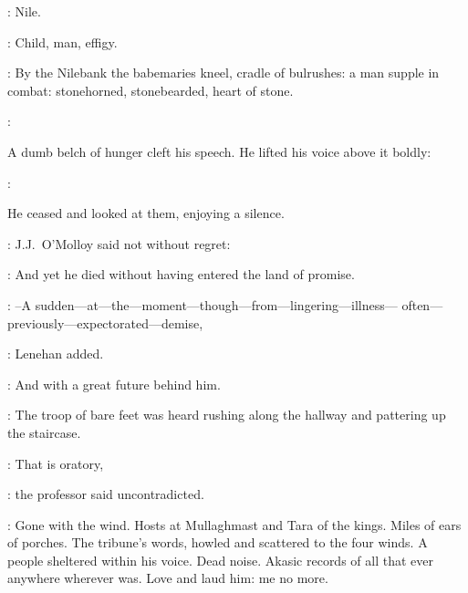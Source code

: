 \StephenInt:
Nile.

\StephenInt:
Child,
man,
effigy.

\StephenInt:
By the Nilebank
the babemaries kneel,
cradle of bulrushes:
a man supple in combat:
stonehorned,
stonebearded,
heart of stone.

\machugh:

A dumb belch of hunger cleft his speech.
He lifted his voice above it boldly:

\machugh:

He ceased and looked at them, enjoying a silence.



:
J.J.~O'Molloy said
not without regret:

\jjom:
And yet he died
without having entered the land of promise.

\lenehan:
--A sudden---at---the---moment---though---from---lingering---illness---%
often---previously---expectorated---demise,

:
Lenehan added.

\lenehan:
And with a great future behind him.

:
The troop of bare feet was heard rushing along the hallway
and pattering up the staircase.

\machugh:
That is oratory,

:
the professor said uncontradicted.

\machugh:
Gone with the wind.
Hosts at Mullaghmast and Tara of the kings.
Miles of ears of porches.
The tribune's words,
howled and scattered to the four winds.
A people sheltered within his voice.
Dead noise.
Akasic records of all that ever anywhere wherever was.
Love and laud him: me no more.


